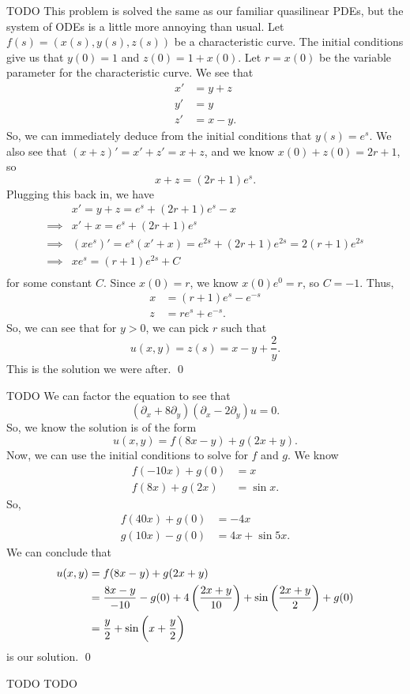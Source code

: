 \documentclass{article}
\renewcommand{\d}{\partial}
\begin{document}
\newpage
{} TODO \tri
\hop
\solution
This problem is solved the same as our familiar quasilinear PDEs, but the system of ODEs is a little more annoying than usual. Let $f(s) = (x(s), y(s),z(s))$ be a characteristic curve. The initial conditions give us that $y(0) = 1$ and $z(0) = 1 + x(0)$. Let $r = x(0)$ be the variable parameter for the characteristic curve. 
\hop 
We see that 
\begin{align*}
    x' &= y + z \\
    y' &= y\\
    z' &= x - y.
\end{align*}
So, we can immediately deduce from the initial conditions that $y(s) = e^s$. We also see that $(x+z)' = x'+z' = x+z$, and we know $x(0)+z(0) = 2r +1$, so \[x+z = (2r+1)e^s.\] 
Plugging this back in, we have 
\begin{align*}
    & x' = y+z = e^s+(2r+1)e^s - x \\ 
    \implies & x' + x = e^s + (2r+1)e^s \\
    \implies & (xe^{s})' = e^s(x' + x) = e^{2s} + (2r+1)e^{2s}= 2(r+1)e^{2s} \\
    \implies & xe^s = (r+1)e^{2s} + C\\
\end{align*}
for some constant $C$. Since $x(0) = r$, we know $x(0)e^0 = r$, so $C = -1$. Thus, 
\begin{align*}
    x &= (r+1)e^s - e^{-s}\\
    z &= re^s + e^{-s}.
\end{align*}
So, we can see that for $y > 0$, we can pick $r$ such that 
\[u(x,y) = z(s) = x - y + \frac{2}{y}.\]
This is the solution we were after. \qed


\newpage
{} TODO \tri
\hop
\solution
We can factor the equation to see that 
\[(\d_x+8\d_y)(\d_x-2\d_y)u = 0.\]
So, we know the solution is of the form 
\[u(x,y) = f(8x-y) + g(2x+y).\]
Now, we can use the initial conditions to solve for $f$ and $g$. We know 
\begin{align*}
    f(-10x)+g(0) &= x\\
    f(8x) + g(2x) &= \sin x.
\end{align*}
So, 
\begin{align*}
    f(40x) + g(0) &= -4x \\
    g(10x) - g(0) &= 4x + \sin 5x.
\end{align*}
We can conclude that 
\begin{align*}
    u(x,y) &= f(8x - y) + g(2x + y) \\
    &= \frac{8x-y}{-10} - g(0) + 4\del{\frac{2x+y}{10}} + \sin \del{\frac{2x+y}{2}} + g(0)\\
    &= \frac{y}{2} + \sin\del{x+ \frac{y}{2}}
\end{align*}
is our solution. \qed


\newpage
{} TODO \tri
\hop
\solution
TODO
\end{document}
